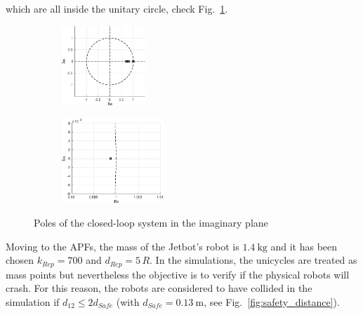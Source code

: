\documentclass{ifacconf}
\begin{document}
which are all inside the unitary circle,
check Fig.~\ref{fig:poles-simulation}.
\begin{figure}[b]
    \centering
    \hspace{-1.5cm}
    \begin{subfigure}[b]{0.3\columnwidth}
        \includegraphics[height=3cm]{images/simulations/poles_simulations.eps}
    \end{subfigure}
    \hspace{0.3cm}
    \begin{subfigure}[b]{0.3\columnwidth}
        \includegraphics[height=3.2cm]{images/simulations/poles_simulations_zoom.eps}
    \end{subfigure}
    \caption{Poles of the closed-loop system in the imaginary plane}
    \label{fig:poles-simulation}
\end{figure}
Moving to the APFs, the mass of the Jetbot's robot is 
$\SI{1.4}{\kilo\gram}$ and it has been chosen $k_{Rep} = 700$
and $d_{Rep} = 5 \, R$.
In the simulations, the unicycles are treated as mass points but
nevertheless the objective is to verify if the physical robots will crash.
For this reason, the robots are considered to have collided in the simulation
if $d_{12} \leq 2 d_{Safe}$ (with $d_{Safe} = \SI{0.13}{\meter}$, 
see Fig.~\ref{fig:safety_distance}).
\end{document}
